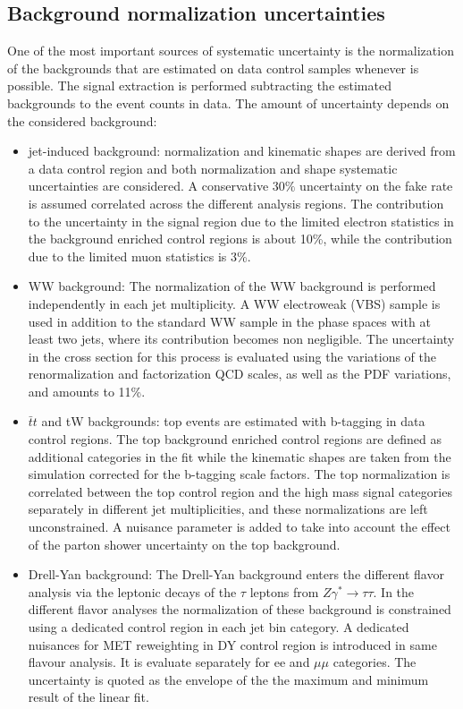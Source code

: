 \subsection*{Background normalization uncertainties}
One of the most important sources of systematic uncertainty is the normalization of the backgrounds that are estimated on data control samples whenever is possible. The signal extraction is performed subtracting the estimated backgrounds to the event counts in data. The amount of uncertainty depends on the considered background:
\begin{itemize}
\item  jet-induced background: normalization and kinematic shapes are derived from a
data control region and both normalization and shape systematic uncertainties are
considered. A conservative 30$\%$ uncertainty on the fake rate is assumed correlated across the different analysis regions. The contribution to the uncertainty in the signal region due to the limited electron statistics in the background enriched control regions is about 10\%, while the contribution due
to the limited muon statistics is 3\%. 
\item WW background: The normalization of the WW background is performed independently in each jet multiplicity. 
A WW electroweak (VBS) sample is used in addition to the standard WW sample in
the phase spaces with at least two jets, where its contribution becomes non negligible.
The uncertainty in the cross section for this process is evaluated using the variations
of the renormalization and factorization QCD scales, as well as the PDF variations,
and amounts to 11\%.
\item $\bar{t}t$ and tW backgrounds: top events are estimated with b-tagging in data control regions. 
The top background enriched control regions are defined as additional categories in the fit while the kinematic shapes are taken 
from the simulation corrected for the b-tagging scale factors. 
The top normalization is correlated between the top control region and the high mass signal categories 
separately in  different jet multiplicities, and these normalizations are left unconstrained. 
A nuisance parameter is added to take into account the effect of the parton shower uncertainty on the top background.

\item Drell-Yan background: The Drell-Yan background enters the different flavor analysis via the leptonic decays of the $\tau$ leptons from $Z \gamma^* \to \tau \tau$. In the different flavor
analyses the normalization of these background is constrained using a dedicated control region in each jet bin category. 
A dedicated nuisances for MET reweighting in DY control region is introduced in same flavour analysis. It is evaluate separately for ee and $\mu \mu$ categories. 
The uncertainty is quoted as the envelope of the the maximum and minimum result of the linear fit.


\end{itemize}
